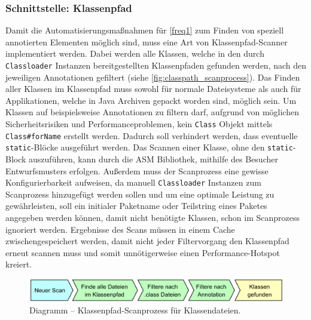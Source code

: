 \subsubsection{Schnittstelle: Klassenpfad}
\label{classpath_interface}
Damit die Automatisierungsmaßnahmen für \autoref{freq1} zum Finden von speziell annotierten Elementen möglich sind, muss eine Art von Klassenpfad-Scanner implementiert werden. Dabei werden alle Klassen, welche in den durch \texttt{Classloader} Instanzen bereitgestellten Klassenpfaden gefunden werden, nach den jeweiligen Annotationen gefiltert (siehe \autoref{fig:classpath_scanprocess}). Das Finden aller Klassen im Klassenpfad muss sowohl für normale Dateisysteme als auch für Applikationen, welche in Java Archiven gepackt worden sind, möglich sein. Um Klassen auf beispielsweise Annotationen zu filtern darf, aufgrund von möglichen Sicherheitsrisiken und Performanceproblemen, kein \texttt{Class} Objekt mittels \texttt{Class\#forName} erstellt werden. Dadurch soll verhindert werden, dass eventuelle \texttt{static}-Blöcke ausgeführt werden. Das Scannen einer Klasse, ohne den \texttt{static}-Block auszuführen, kann durch die ASM Bibliothek, mithilfe des Besucher Entwurfsmusters erfolgen. Außerdem muss der Scanprozess eine gewisse Konfigurierbarkeit aufweisen, da manuell \texttt{Classloader} Instanzen zum Scanprozess hinzugefügt werden sollen und um eine optimale Leistung zu gewährleisten, soll ein initialer Paketname oder Teilstring eines Paketes angegeben werden können, damit nicht benötigte Klassen, schon im Scanprozess ignoriert werden. Ergebnisse des Scans müssen in einem Cache zwischengespeichert werden, damit nicht jeder Filtervorgang den Klassenpfad erneut scannen muss und somit unnötigerweise einen Performance-Hotspot kreiert.
\begin{figure}[H]
	\centering
	\includegraphics[width=\textwidth]{Abbildungen/Klassenpfad Scanprozess.png}
	\caption{Diagramm -- Klassenpfad-Scanprozess für Klassendateien.}
	\label{fig:classpath_scanprocess}
\end{figure}
